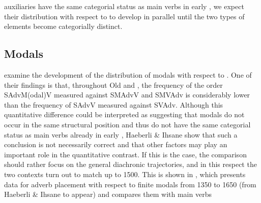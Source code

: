 \documentclass[output=paper]{langsci/langscibook}
\begin{document}
auxiliaries have the same categorial status as main verbs in early , we
expect their distribution with respect to  to develop in parallel until
the two types of elements become categorially distinct.

\subsection{Modals}

\textcite{HaeIhsta} examine the development of the distribution of
modals with respect to . One of their findings is that, throughout Old
and , the frequency of the order SAdvM(odal)V measured against
SMAdvV and SMVAdv is considerably lower than the frequency of SAdvV measured
against SVAdv. Although this quantitative difference could be interpreted as
suggesting that modals do not occur in the same structural position and thus do
not have the same categorial status as main verbs already in early ,
Haeberli \& Ihsane show that such a conclusion is not necessarily correct and
that other factors may play an important role in the quantitative contrast. If
this is the case, the comparison should rather focus on the general diachronic
trajectories, and in this respect the two contexts turn out to match up to
1500. This is shown in , which presents data for adverb
placement with respect to finite modals from 1350 to 1650 (from Haeberli \&
Ihsane to appear) and compares them with main verbs
\end{document}
